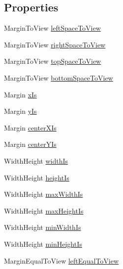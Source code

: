 \subsection*{Properties}
\begin{DoxyCompactItemize}
\item 
Margin\+To\+View \mbox{\hyperlink{interface_s_d_auto_layout_model_ad48fb8fe6244815b4682d96a27118a36}{left\+Space\+To\+View}}
\item 
Margin\+To\+View \mbox{\hyperlink{interface_s_d_auto_layout_model_ad9586f9e1e030a8ec8f4908051d02d98}{right\+Space\+To\+View}}
\item 
Margin\+To\+View \mbox{\hyperlink{interface_s_d_auto_layout_model_ae02d23a35ab53dce8152930c192c8e1f}{top\+Space\+To\+View}}
\item 
Margin\+To\+View \mbox{\hyperlink{interface_s_d_auto_layout_model_adfc528136766e06f6393d137641a21fb}{bottom\+Space\+To\+View}}
\item 
Margin \mbox{\hyperlink{interface_s_d_auto_layout_model_ab7718630e1ba1fee54d920da32cf1dc3}{x\+Is}}
\item 
Margin \mbox{\hyperlink{interface_s_d_auto_layout_model_a2ab0b8cf517f9b888834959b83e18eba}{y\+Is}}
\item 
Margin \mbox{\hyperlink{interface_s_d_auto_layout_model_a3d768641ff2714374a2aa5753d5dfd62}{center\+X\+Is}}
\item 
Margin \mbox{\hyperlink{interface_s_d_auto_layout_model_a84f80c93efa3a28db1f3c01cdd24bb35}{center\+Y\+Is}}
\item 
Width\+Height \mbox{\hyperlink{interface_s_d_auto_layout_model_ac70ea727e2501a49fca147b702c4f377}{width\+Is}}
\item 
Width\+Height \mbox{\hyperlink{interface_s_d_auto_layout_model_a286a63171a50d0ffc9b28ba14fb6b1c4}{height\+Is}}
\item 
Width\+Height \mbox{\hyperlink{interface_s_d_auto_layout_model_abb1d350c2a501202ae7f309161ca2c48}{max\+Width\+Is}}
\item 
Width\+Height \mbox{\hyperlink{interface_s_d_auto_layout_model_a0c469e3f084e81c9036fda5f24ab6f17}{max\+Height\+Is}}
\item 
Width\+Height \mbox{\hyperlink{interface_s_d_auto_layout_model_a24a00b8fe608bc1d8a4fda762d2b6e44}{min\+Width\+Is}}
\item 
Width\+Height \mbox{\hyperlink{interface_s_d_auto_layout_model_a34589b1715d63a82ebf095620b72b713}{min\+Height\+Is}}
\item 
Margin\+Equal\+To\+View \mbox{\hyperlink{interface_s_d_auto_layout_model_a9b262458f509095cfdc89665b80ce878}{left\+Equal\+To\+View}}

\end{DoxyCompactItemize}
